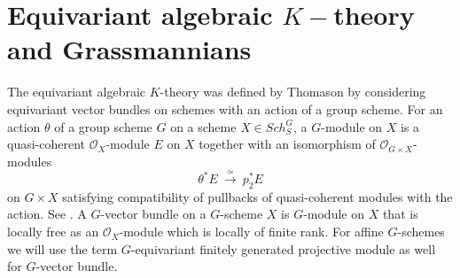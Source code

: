 \documentclass[11pt,twoside]{amsart}
\theoremstyle{definition}
\theoremstyle{remark}
\numberwithin{equation}{section}
\begin{document}
\section{ Equivariant algebraic \texorpdfstring{$K-$}{K-}theory and Grassmannians }
\label{EquivariantAlgebraicKTheoryGrassmannians} 
The equivariant algebraic $K$-theory was defined by Thomason by considering equivariant vector bundles on schemes with an action of a group scheme. 
For an action $\theta$ of a group scheme $G$ on a scheme $X\in Sch^G_S$, a $G$-module on $X$ is a quasi-coherent $\mathcal{O}_X$-module $E$ on $X$ together with an isomorphism of $\mathcal{O}_{G\times X}$-modules 
$$\theta^*E\ \xrightarrow{\simeq}\ p_2^*E $$
on $G\times X$
satisfying compatibility of pullbacks of quasi-coherent modules with the action. See \cite[(1.2)]{T87}. A $G$-vector bundle on a $G$-scheme $X$ is $G$-module on $X$ that is locally free as an $\mathcal{O}_X$-module which is locally of finite rank.  For affine $G$-schemes we will use the term $G$-equivariant finitely generated projective module as well for $G$-vector bundle. 
\end{document}
